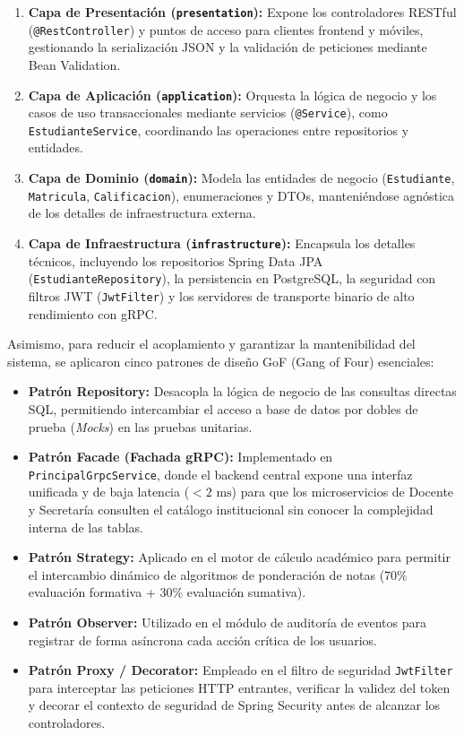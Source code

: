 \documentclass[11pt,a4paper]{article}
\begin{document}
\begin{enumerate}
    \item \textbf{Capa de Presentación (\texttt{presentation}):} Expone los controladores RESTful (\texttt{@RestController}) y puntos de acceso para clientes frontend y móviles, gestionando la serialización JSON y la validación de peticiones mediante Bean Validation.
    \item \textbf{Capa de Aplicación (\texttt{application}):} Orquesta la lógica de negocio y los casos de uso transaccionales mediante servicios (\texttt{@Service}), como \texttt{EstudianteService}, coordinando las operaciones entre repositorios y entidades.
    \item \textbf{Capa de Dominio (\texttt{domain}):} Modela las entidades de negocio (\texttt{Estudiante}, \texttt{Matricula}, \texttt{Calificacion}), enumeraciones y DTOs, manteniéndose agnóstica de los detalles de infraestructura externa.
    \item \textbf{Capa de Infraestructura (\texttt{infrastructure}):} Encapsula los detalles técnicos, incluyendo los repositorios Spring Data JPA (\texttt{EstudianteRepository}), la persistencia en PostgreSQL, la seguridad con filtros JWT (\texttt{JwtFilter}) y los servidores de transporte binario de alto rendimiento con gRPC.
\end{enumerate}

Asimismo, para reducir el acoplamiento y garantizar la mantenibilidad del sistema, se aplicaron cinco patrones de diseño GoF (Gang of Four) esenciales:

\begin{itemize}
    \item \textbf{Patrón Repository:} Desacopla la lógica de negocio de las consultas directas SQL, permitiendo intercambiar el acceso a base de datos por dobles de prueba (\textit{Mocks}) en las pruebas unitarias.
    \item \textbf{Patrón Facade (Fachada gRPC):} Implementado en \texttt{PrincipalGrpcService}, donde el backend central expone una interfaz unificada y de baja latencia ($< 2\text{ ms}$) para que los microservicios de Docente y Secretaría consulten el catálogo institucional sin conocer la complejidad interna de las tablas.
    \item \textbf{Patrón Strategy:} Aplicado en el motor de cálculo académico para permitir el intercambio dinámico de algoritmos de ponderación de notas (70\% evaluación formativa + 30\% evaluación sumativa).
    \item \textbf{Patrón Observer:} Utilizado en el módulo de auditoría de eventos para registrar de forma asíncrona cada acción crítica de los usuarios.
    \item \textbf{Patrón Proxy / Decorator:} Empleado en el filtro de seguridad \texttt{JwtFilter} para interceptar las peticiones HTTP entrantes, verificar la validez del token y decorar el contexto de seguridad de Spring Security antes de alcanzar los controladores.
\end{itemize}
\end{document}
